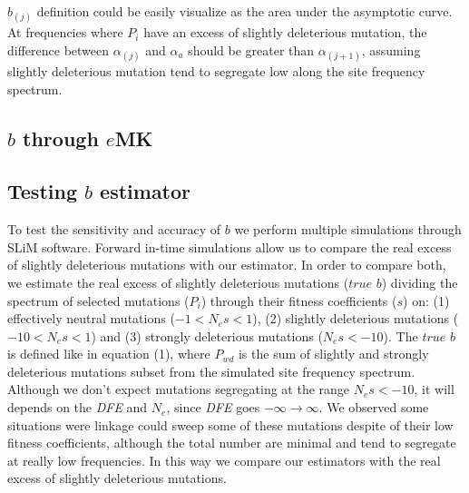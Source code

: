 \documentclass[11pt]{article}
\begin{document}
$b_{(j)}$ definition could be easily visualize as the area under the asymptotic curve. At frequencies where $P_{i}$ have an excess of slightly deleterious mutation, the difference between $\alpha_{(j)}$ and $\alpha_{a}$ should be greater than $\alpha_{(j+1)}$, assuming slightly deleterious mutation tend to segregate low along the site frequency spectrum.

\begin{figure}
	\centering	
	\scalebox{0.4}{}
\end{figure}

\subsection{$b$ through $e$MK}


\subsection{Testing $b$ estimator}
To test the sensitivity and accuracy of $b$ we perform multiple simulations through SLiM software. Forward in-time simulations allow us to compare the real excess of slightly deleterious mutations with our estimator. In order to compare both, we estimate the real excess of slightly deleterious mutations ($true$ $b$) dividing the spectrum of selected mutations ($P_{i}$) through their fitness coefficients ($s$) on: (1) effectively neutral mutations ($-1 < N_{e}s < 1$), (2) slightly deleterious mutations ($-10 < N_{e}s < 1$) and (3) strongly deleterious mutations ($N_{e}s < -10$). The $true$ $b$ is defined like in equation (1), where $P_{wd}$ is the sum of slightly and strongly deleterious mutations subset from the simulated site frequency spectrum. Although we don't expect mutations segregating at the range $N_{e}s < -10$, it will depends on the \emph{DFE} and $N_{e}$, since \emph{DFE} goes $-\infty \to \infty$. We observed some situations were linkage could sweep some of these mutations despite of their low fitness coefficients, although the total number are minimal and tend to segregate at really low frequencies. In this way we compare our estimators with the real excess of slightly deleterious mutations.
\end{document}
